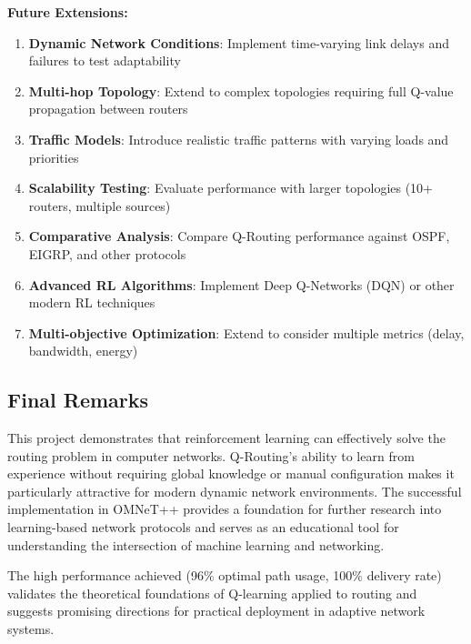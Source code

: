\documentclass[12pt,a4paper]{article}
\begin{document}
\textbf{Future Extensions:}
\begin{enumerate}
    \item \textbf{Dynamic Network Conditions}: Implement time-varying link delays and failures to test adaptability
    
    \item \textbf{Multi-hop Topology}: Extend to complex topologies requiring full Q-value propagation between routers
    
    \item \textbf{Traffic Models}: Introduce realistic traffic patterns with varying loads and priorities
    
    \item \textbf{Scalability Testing}: Evaluate performance with larger topologies (10+ routers, multiple sources)
    
    \item \textbf{Comparative Analysis}: Compare Q-Routing performance against OSPF, EIGRP, and other protocols
    
    \item \textbf{Advanced RL Algorithms}: Implement Deep Q-Networks (DQN) or other modern RL techniques
    
    \item \textbf{Multi-objective Optimization}: Extend to consider multiple metrics (delay, bandwidth, energy)
\end{enumerate}

\subsection{Final Remarks}

This project demonstrates that reinforcement learning can effectively solve the routing problem in computer networks. Q-Routing's ability to learn from experience without requiring global knowledge or manual configuration makes it particularly attractive for modern dynamic network environments. The successful implementation in OMNeT++ provides a foundation for further research into learning-based network protocols and serves as an educational tool for understanding the intersection of machine learning and networking.

The high performance achieved (96\% optimal path usage, 100\% delivery rate) validates the theoretical foundations of Q-learning applied to routing and suggests promising directions for practical deployment in adaptive network systems.
\end{document}
